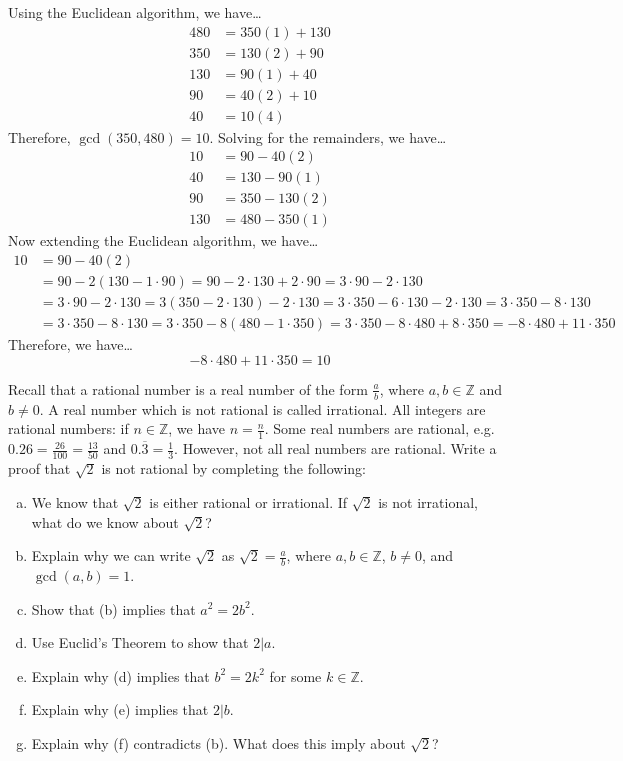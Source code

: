 \documentclass[11pt,letterpaper]{article}
\begin{document}
\sol Using the Euclidean algorithm, we have\dots
	\[
	\begin{aligned}
	480&= 350(1) + 130 \\[0.3cm]
	350&= 130(2) + 90 \\[0.3cm]
	130&= 90(1) + 40 \\[0.3cm]
	90&= 40(2) + 10 \\[0.3cm]
	40&= 10(4)
	\end{aligned}
	\]
Therefore, $\gcd(350, 480)= 10$. Solving for the remainders, we have\dots
	\[
	\begin{aligned}
	10&= 90 - 40(2) \\
	40&= 130 - 90(1) \\
	90&= 350 - 130(2) \\
	130&= 480 - 350(1) 
	\end{aligned}
	\]
Now extending the Euclidean algorithm, we have\dots
	\[
	\begin{aligned}
	10&= 90 - 40(2) \\[0.3cm]
	&= 90 - 2(130 - 1 \cdot 90)= 90 - 2 \cdot 130 + 2 \cdot 90= 3 \cdot 90 - 2 \cdot 130 \\[0.3cm]
	&= 3 \cdot 90 - 2 \cdot 130= 3(350 - 2 \cdot 130) - 2 \cdot 130= 3 \cdot 350 - 6 \cdot 130 - 2 \cdot 130= 3 \cdot 350 - 8 \cdot 130 \\[0.3cm]
	&= 3 \cdot 350 - 8 \cdot 130= 3 \cdot 350 - 8(480 - 1 \cdot 350)= 3 \cdot 350 - 8 \cdot 480 + 8 \cdot 350= -8 \cdot 480 + 11 \cdot 350
	\end{aligned}
	\]
Therefore, we have\dots
	\[
	-8 \cdot 480 + 11 \cdot 350= 10
	\]



\newpage



 Recall that a rational number is a real number of the form $\frac{a}{b}$, where $a, b \in \mathbb{Z}$ and $b \neq 0$. A real number which is not rational is called irrational. All integers are rational numbers: if $n \in \mathbb{Z}$, we have $n= \frac{n}{1}$. Some real numbers are rational, e.g. $0.26= \frac{26}{100}= \frac{13}{50}$ and $0.\overline{3}= \frac{1}{3}$. However, not all real numbers are rational. Write a proof that $\sqrt{2}$ is not rational by completing the following:
	\begin{enumerate}[(a)]
	\item We know that $\sqrt{2}$ is either rational or irrational. If $\sqrt{2}$ is not irrational, what do we know about $\sqrt{2}$? 
	\item Explain why we can write $\sqrt{2}$ as $\sqrt{2}= \frac{a}{b}$, where $a, b \in \mathbb{Z}$, $b \neq 0$, and $\gcd(a, b)= 1$. 
	\item Show that (b) implies that $a^2= 2b^2$.
	\item Use Euclid's Theorem to show that $2 | a$. 
	\item Explain why (d) implies that $b^2= 2k^2$ for some $k \in \mathbb{Z}$.
	\item Explain why (e) implies that $2 | b$. 
	\item Explain why (f) contradicts (b). What does this imply about $\sqrt{2}$?
	\end{enumerate} \pspace
\end{document}
